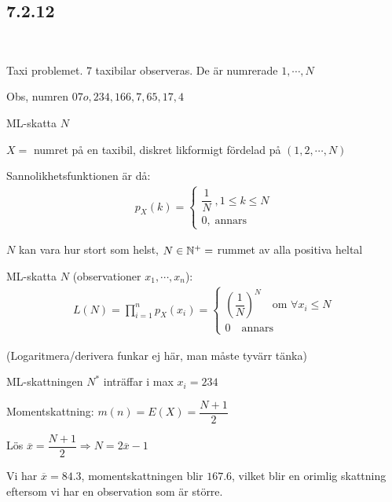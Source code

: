 \subsection{7.2.12}\hfill\\\par
\noindent Taxi problemet. 7 taxibilar observeras. De är numrerade $1,\cdots, N$\par
\noindent Obs, numren $07o, 234, 166, 7, 65, 17, 4$
\par\bigskip
\noindent ML-skatta $N$
\par\bigskip
\noindent $X = $ numret på en taxibil, diskret likformigt fördelad på $(1,2,\cdots, N)$
\par\bigskip
\noindent Sannolikhetsfunktionen är då:
\begin{equation*}
  \begin{gathered}
    p_X(k) = \begin{cases}\dfrac{1}{N}\;, 1\leq k\leq N\\0,\;\text{annars}\end{cases}
  \end{gathered}
\end{equation*}
\par\bigskip
\noindent $N$ kan vara hur stort som helst, $N\in \mathbb{N}^+ = $ rummet av alla positiva heltal
\par\bigskip
\noindent ML-skatta $N$ (observationer $x_1,\cdots,x_n$):
\begin{equation*}
  \begin{gathered}
    L(N) = \prod_{i=1}^{n}p_X(x_i) = \begin{cases}\left(\dfrac{1}{N}\right)^N\quad \text{om } \forall x_i\leq N\\0\quad\text{annars}\end{cases}
  \end{gathered}
\end{equation*}
\par\bigskip
\noindent (Logaritmera/derivera funkar ej här, man måste tyvärr tänka)
\par\bigskip
\noindent ML-skattningen $N^*$ inträffar i max $x_i = 234$
\par\bigskip
\noindent Momentskattning: $m(n) = E(X) = \dfrac{N+1}{2}$\par
\noindent Lös $\overline{x} = \dfrac{N+1}{2}\Rightarrow N = 2\overline{x}-1$\par
\noindent Vi har $\overline{x} = 84.3$, momentskattningen blir $167.6$, vilket blir en orimlig skattning eftersom vi har en observation som är större.
\par\bigskip
